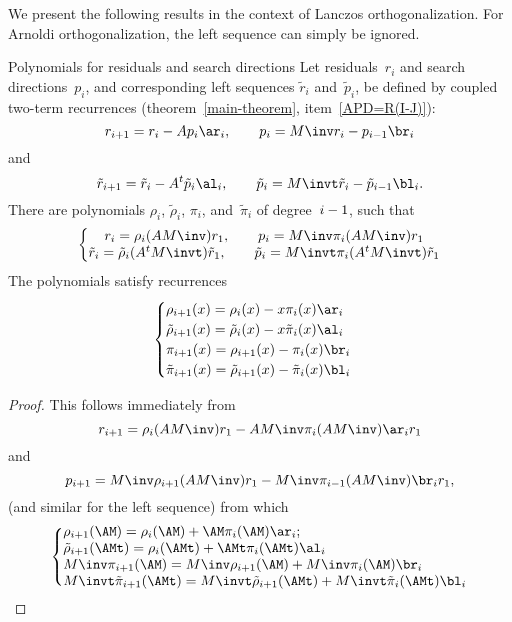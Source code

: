\documentclass[11pt]{artikel3}
\begin{document}
\begin{Outline}
We present the following results 
in the context of Lanczos orthogonalization.
For Arnoldi orthogonalization, the left sequence can simply be ignored.

\begin{llemma}{Polynomials for residuals and search directions}
\label{lemma:PR-polynomials}
Let residuals~$r_i$ and search directions~$p_i$,
and corresponding left sequences $\tilde r_i$ and~$\tilde p_i$,
be defined by coupled two-term recurrences
(theorem~\ref{main-theorem}, item~\ref{APD=R(I-J)}):
\[ r_{i+1}=r_i-Ap_i\ar_i,\qquad p_i=M\inv r_i-p_{i-1}\br_i \]
and
\[ \tilde r_{i+1}=\tilde r_i-A^t\tilde p_i\al_i,\qquad
    \tilde p_i=M\invt \tilde r_i-\tilde p_{i-1}\bl_i .\]
There are polynomials $\rho_i$, $\tilde \rho_i$, $\pi_i$, and~$\tilde\pi_i$
of degree~$i-\nobreak1$, such that
\begin{equation} \left\{\begin{matrix}
    r_i = \rho_i(AM\inv)r_1,\qquad p_i = M\inv\pi_i(AM\inv)r_1\cr
    \tilde r_i = \tilde \rho_i(A^tM\invt)\tilde r_1,\qquad 
        \tilde p_i = M\invt\pi_i(A^tM\invt)\tilde r_1\cr
    \end{matrix}\right. \label{eq:rp-polynomials}\end{equation}
The polynomials satisfy recurrences
\begin{equation}
    \begin{cases}\rho_{i+1}(x)=\rho_i(x)-x\pi_i(x)\ar_i\cr
           \tilde\rho_{i+1}(x)=\tilde\rho_i(x)-x\tilde\pi_i(x)\al_i\cr
           \pi_{i+1}(x)=\rho_{i+1}(x)-\pi_i(x)\br_i\cr
           \tilde\pi_{i+1}(x)=\tilde\rho_{i+1}(x)-\tilde\pi_i(x)\bl_i\cr\end{cases}
    \label{eq:rp-poly-recurrence}\end{equation}
\end{llemma}
\begin{proof}
This follows immediately from
\[ r_{i+1} = \rho_i(AM\inv)r_1-AM\inv\pi_i(AM\inv)\ar_ir_1 \]
and
\[ p_{i+1} = M\inv\rho_{i+1}(AM\inv)r_1
        -M\inv\pi_{i-1}(AM\inv)\br_ir_1, \]
(and similar for the left sequence)
from which
\[
 \left\{\vcenter{\halign{$#$\hfil\cr
    \rho_{i+1}(\AM)=\rho_i(\AM)+\AM\pi_i(\AM)\ar_i;\cr
    \tilde\rho_{i+1}(\AMt)=\rho_i(\AMt)+\AMt\pi_i(\AMt)\al_i\cr
    M\inv\pi_{i+1}(\AM)=M\inv\rho_{i+1}(\AM)+M\inv\pi_i(\AM)\br_i\cr
    M\invt\tilde\pi_{i+1}(\AMt)=M\invt\tilde\rho_{i+1}(\AMt)
                                      +M\invt\tilde\pi_i(\AMt)\bl_i\cr
    }}\right. 
\]
\end{proof}


\end{Outline}
\end{document}
